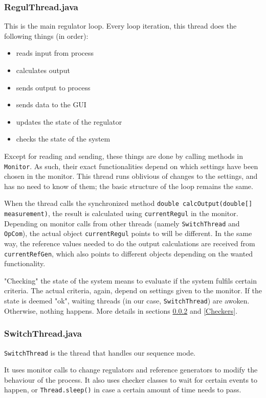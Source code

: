 \subsubsection{RegulThread.java}
This is the main regulator loop. Every loop iteration, this thread does the following things (in order):
\begin{itemize}
\item reads input from process
\item calculates output
\item sends output to process
\item sends data to the GUI
\item updates the state of the regulator
\item checks the state of the system
\end{itemize}

Except for reading and sending, these things are done by calling methods in \texttt{Monitor}. As such, their exact functionalities depend on which settings have been chosen in the monitor. This thread runs oblivious of changes to the settings, and has no need to know of them; the basic structure of the loop remains the same.

When the thread calls the synchronized method \texttt{double calcOutput(double[] measurement)}, the result is calculated using \texttt{currentRegul} in the monitor. Depending on monitor calls from other threads (namely \texttt{SwitchThread} and \texttt{OpCom}), the actual object \texttt{currentRegul} points to will be different. In the same way, the reference values needed to do the output calculations are received from \texttt{currentRefGen}, which also points to different objects depending on the wanted functionality.

"Checking" the state of the system means to evaluate if the system fulfils certain criteria. The actual criteria, again, depend on settings given to the monitor. If the state is deemed "ok", waiting threads (in our case, \texttt{SwitchThread}) are awoken. Otherwise, nothing happens. More details in sections \ref{SwitchThread} and \ref{Checkers}.



\subsubsection{SwitchThread.java}\label{SwitchThread}
\texttt{SwitchThread} is the thread that handles our sequence mode.

It uses monitor calls to change regulators and reference generators to modify the behaviour of the process. It also uses checker classes to wait for certain events to happen, or \texttt{Thread.sleep()} in case a certain amount of time needs to pass.

